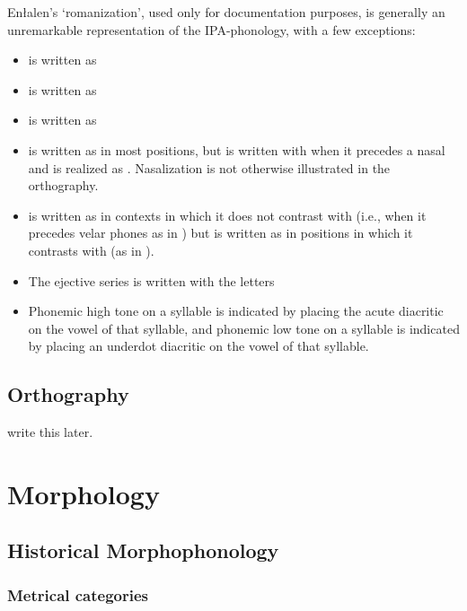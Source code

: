\documentclass[a4paper,11pt,oneside,openany]{memoir}
\begin{document}
Enłalen's `romanization', used only for documentation purposes, is generally an unremarkable representation of the IPA-phonology, with a few exceptions:
\begin{itemize}
    \item {} is written as 
    \item \phipa{\pharox\dwnwrd} is written as 
    \item \phipa{\vell} is written as 
    \item {} is written as  in most positions, but is written with  when it precedes a nasal and is realized as . Nasalization is not otherwise illustrated in the orthography.
    \item \phipa{\engma} is written as  in contexts in which it does not contrast with  (i.e., when it precedes velar phones as in  ) but is written as \ortho{\engga} in positions in which it contrasts with  (as in  ).
    \item The ejective series  is written with the letters \ortho{\ppa{} \tta{} \kka{}}
    \item Phonemic high tone on a syllable is indicated by placing the acute diacritic on the vowel of that syllable, and phonemic low tone on a syllable is indicated by placing an underdot diacritic on the vowel of that syllable.
\end{itemize}

\section{Orthography}

write this later.


\chapter{Morphology}

\section{Historical Morphophonology}

\subsection{Metrical categories}
\end{document}
